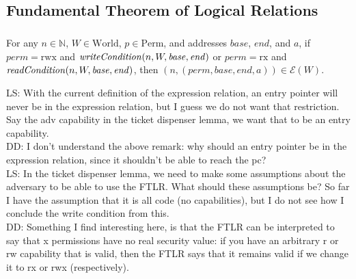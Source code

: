 \documentclass[a4paper]{article}
\newcommand{\forcenewline}{$\phantom{v}$\\}
\newcommand\lau[1]{{\color{purple} \sf \footnotesize {LS: #1}}\\}
\newcommand\dominique[1]{{\color{purple} \sf \footnotesize {DD: #1}}\\}
\newcommand{\var}[1]{\mathit{#1}}
\newcommand{\perm}{\var{perm}}
\newcommand{\plainfun}[2]{
  \ifthenelse{\equal{#2}{}}
             {\mathit{#1}}
             {\mathit{#1}(#2)}
}
\newcommand{\readCond}[1]{\plainfun{readCondition}{#1}}
\newcommand{\writeCond}[1]{\plainfun{writeCondition}{#1}}
\newcommand{\asmType}{\plaindom{AsmType}}
\newcommand{\plaindom}[1]{\mathrm{#1}}
\newcommand{\nats}{\mathbb{N}}
\newcommand{\Perms}{\plaindom{Perm}}
\newcommand{\Worlds}{\plaindom{World}}
\newcommand{\intr}[2]{\mathcal{#1}}
\newcommand{\exprintr}[1]{\intr{E}{#1}}
\newcommand{\stder}{\exprintr{\asmType}}
\newcommand{\npair}[2][n]{\left(#1,#2 \right)}
\newcommand{\plainperm}[1]{\mathrm{#1}}
\newcommand{\exec}{\plainperm{rx}}
\newcommand{\rwx}{\plainperm{rwx}}
\begin{document}
\subsection{Fundamental Theorem of Logical Relations}
\begin{lemma} \forcenewline
  For any $n \in \nats$, $W \in \Worlds$, $p\in \Perms$, and addresses $\var{base}$, $\var{end}$, and $a$, if $\perm = \rwx$ and $\writeCond{n,W,\var{base},\var{end}}$ or $\perm = \exec$ and $\readCond{n,W,\var{base},\var{end}}$, then $\npair{(\perm, \var{base}, \var{end}, a)} \in \stder(W)$.
\end{lemma} %
\lau{With the current definition of the expression relation, an entry pointer will never be in the expression relation, but I guess we do not want that restriction. Say the adv capability in the ticket dispenser lemma, we want that to be an entry capability.}
\dominique{I don't understand the above remark: why should an entry pointer be
  in the expression relation, since it shouldn't be able to reach the pc?}
\lau{In the ticket dispenser lemma, we need to make some assumptions about the adversary to be able to use the FTLR. What should these assumptions be? So far I have the assumption that it is all code (no capabilities), but I do not see how I conclude the write condition from this.}
\dominique{Something I find interesting here, is that the FTLR can be interpreted to say that x permissions have no real security value: if you have an arbitrary r or rw capability that is valid, then the FTLR says that it remains valid if we change it to rx or rwx (respectively).}
\end{document}
